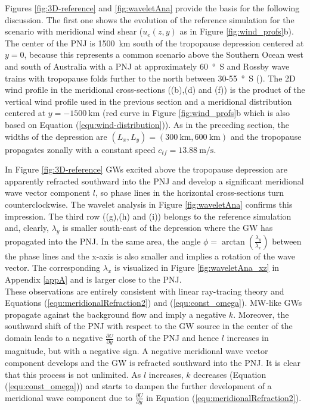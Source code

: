 Figures \ref{fig:3D-reference} and \ref{fig:waveletAna} provide the basis for the following discussion. The first one shows the evolution of the reference simulation for the scenario with meridional wind shear ($u_e(z,y)$ as in Figure \ref{fig:wind_profs}b). The center of the PNJ is \SI{1500}{\kilo\meter} south of the tropopause depression centered at $y=0$, because this represents a common scenario above the Southern Ocean west and south of Australia with a PNJ at approximately \SI{60}{\degree S} and Rossby wave trains with tropopause folds further to the north between 30-\SI{55}{\degree S} (\cite[]{skerlak_tropopause_2015}). The 2D wind profile in the meridional cross-sections ((b),(d) and (f)) is the product of the vertical wind profile used in the previous section and a meridional distribution centered at $y=\SI{-1500}{\kilo\meter}$ (red curve in Figure \ref{fig:wind_profs}b which is also based on Equation (\ref{equ:wind-distribution})). As in the preceding section, the widths of the depression are $(L_x,L_y)=(\SI{300}{\kilo\meter},\SI{600}{\kilo\meter})$ and the tropopause propagates zonally with a constant speed $c_{tf}=\SI{13.88}{\meter\per\second}$.

In Figure \ref{fig:3D-reference} GWs excited above the tropopause depression are apparently refracted southward into the PNJ and develop a significant meridional wave vector component $l$, so phase lines in the horizontal cross-sections turn counterclockwise. The wavelet analysis in Figure \ref{fig:waveletAna} confirms this impression. The third row ((g),(h) and (i)) belongs to the reference simulation and, clearly, $\lambda_y$ is smaller south-east of the depression where the GW has propagated into the PNJ. In the same area, the angle $\phi=\arctan(\frac{\lambda_y}{\lambda_x})$ between the phase lines and the x-axis is also smaller and implies a rotation of the wave vector. The corresponding $\lambda_x$ is visualized in Figure \ref{fig:waveletAna_xz} in Appendix \ref{appA} and is larger close to the PNJ. \\
These observations are entirely consistent with linear ray-tracing theory and Equations (\ref{equ:meridionalRefraction2}) and (\ref{equ:const_omega}). MW-like GWs propagate against the background flow and imply a negative $k$. Moreover, the southward shift of the PNJ with respect to the GW source in the center of the domain leads to a negative $\frac{\partial U}{\partial y}$ north of the PNJ and hence $l$ increases in magnitude, but with a negative sign. A negative meridional wave vector component develops and the GW is refracted southward into the PNJ. It is clear that this process is not unlimited. As $l$ increases, $k$ decreases (Equation (\ref{equ:const_omega})) and starts to dampen the further development of a meridional wave component due to $\frac{\partial U}{\partial y}$ in Equation (\ref{equ:meridionalRefraction2}).

